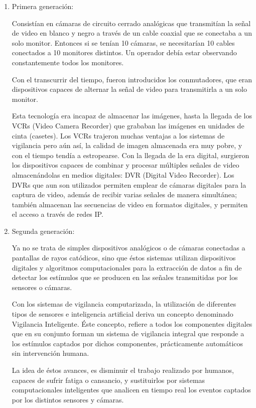 \documentclass[a4paper,12pt,oneside,spanish]{book}
\begin{document}
\begin{enumerate}
	\baselineskip 16pt
	\item Primera generación: \par 
	Consistían en cámaras de circuito cerrado analógicas que transmitían la señal de video en blanco y negro a través de un cable coaxial que se conectaba a un solo monitor. Entonces si se tenían 10 cámaras, se necesitarían 10 cables conectados a 10 monitores distintos. Un operador debía estar observando constantemente todos los monitores. \par 
	Con el transcurrir del tiempo, fueron introducidos los conmutadores, que eran dispositivos capaces de alternar la señal de video para transmitirla a un solo monitor. \par  
	Esta tecnología era incapaz de almacenar las imágenes, hasta la llegada de los VCRs (Video Camera Recorder) que grababan las imágenes en unidades de cinta (casetes). Los VCRs trajeron muchas ventajas a los sistemas de vigilancia pero aún así, la calidad de imagen almacenada era muy pobre, y con el tiempo tendía a estropearse. Con la llegada de la era digital, surgieron los dispositivos capaces de combinar y procesar múltiples señales de video almacenándolas en medios digitales: DVR (Digital Video Recorder). Los DVRs que aun son utilizados permiten emplear de cámaras digitales para la captura de video, además de recibir varias señales de manera simultánea; también almacenan las secuencias de video en formatos digitales, y permiten el acceso a través de redes IP.\\	
	
	\item Segunda generación: \par
	Ya no se trata de simples dispositivos analógicos o de cámaras conectadas a pantallas de rayos catódicos, sino que éstos sistemas utilizan dispositivos digitales y algoritmos computacionales para la extracción de datos a fin de detectar los estímulos que se producen en las señales transmitidas por los sensores o cámaras. \par
	Con los sistemas de vigilancia computarizada, la utilización de diferentes tipos de sensores e inteligencia artificial deriva un concepto denominado Vigilancia Inteligente. Éste concepto, refiere a todos los componentes digitales que en su conjunto forman un sistema de vigilancia integral que responde a los estímulos captados por dichos componentes, prácticamente automáticos sin intervención humana. \par
	\par
	La idea de éstos avances, es disminuir el trabajo realizado por  humanos, capaces de sufrir fatiga o cansancio, y sustituirlos por sistemas computacionales inteligentes que analicen en tiempo real los eventos captados por los distintos sensores y cámaras.\\
	

\end{enumerate}
\end{document}

